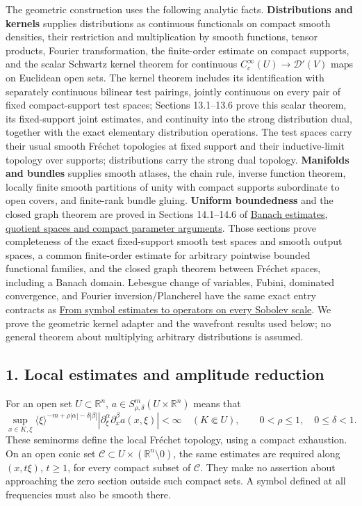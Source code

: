 \documentclass[
  11pt,
]{article}
\begin{document}
The geometric construction uses the following analytic facts.
\textbf{Distributions and kernels} supplies distributions as continuous
functionals on compact smooth densities, their restriction and
multiplication by smooth functions, tensor products, Fourier
transformation, the finite-order estimate on compact supports, and the
scalar Schwartz kernel theorem for continuous
\(C_c^\infty(U)\to\mathcal D'(V)\) maps on Euclidean open sets. The
kernel theorem includes its identification with separately continuous
bilinear test pairings, jointly continuous on every pair of fixed
compact-support test spaces; Sections 13.1--13.6 prove this scalar
theorem, its fixed-support joint estimates, and continuity into the
strong distribution dual, together with the exact elementary
distribution operations. The test spaces carry their usual smooth
Fréchet topologies at fixed support and their inductive-limit topology
over supports; distributions carry the strong dual topology.
\textbf{Manifolds and bundles} supplies smooth atlases, the chain rule,
inverse function theorem, locally finite smooth partitions of unity with
compact supports subordinate to open covers, and finite-rank bundle
gluing. \textbf{Uniform boundedness} and the closed graph theorem are
proved in Sections 14.1--14.6 of
\href{banach-foundation-bridges.pdf}{Banach estimates, quotient spaces
and compact parameter arguments}. Those sections prove completeness of
the exact fixed-support smooth test spaces and smooth output spaces, a
common finite-order estimate for arbitrary pointwise bounded functional
families, and the closed graph theorem between Fréchet spaces, including
a Banach domain. Lebesgue change of variables, Fubini, dominated
convergence, and Fourier inversion/Plancherel have the same exact entry
contracts as \href{euclidean-symbol-calculus.pdf}{From symbol estimates
to operators on every Sobolev scale}. We prove the geometric kernel
adapter and the wavefront results used below; no general theorem about
multiplying arbitrary distributions is assumed.

\subsection{1. Local estimates and amplitude
reduction}\label{local-estimates-and-amplitude-reduction}

For an open set \(U\subset\mathbb R^n\),
\(a\in S^m_{\rho,\delta}(U\times\mathbb R^n)\) means that \[
\sup_{x\in K,\xi}\langle\xi\rangle^{-m+\rho|\alpha|-\delta|\beta|}
|\partial_\xi^\alpha\partial_x^\beta a(x,\xi)|<\infty
\quad(K\Subset U),
\qquad 0<\rho\leq1,\quad0\leq\delta<1.
\tag{G1}
\] These seminorms define the local Fréchet topology, using a compact
exhaustion. On an open conic set
\(\mathcal C\subset U\times(\mathbb R^n\setminus0)\), the same estimates
are required along \((x,t\xi)\), \(t\geq1\), for every compact subset of
\(\mathcal C\). They make no assertion about approaching the zero
section outside such compact sets. A symbol defined at all frequencies
must also be smooth there.
\end{document}
